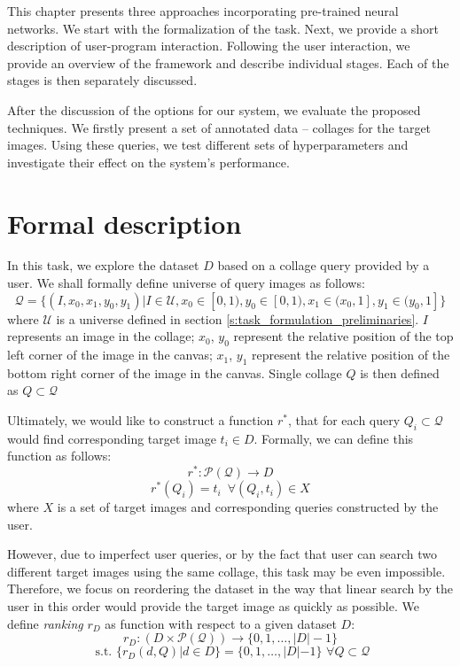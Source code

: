 This chapter presents three approaches incorporating pre-trained neural networks. We start with the formalization of the task. Next, we provide a short description of user-program interaction. Following the user interaction, we provide an overview of the framework and describe individual stages. Each of the stages is then separately discussed. 

After the discussion of the options for our system, we evaluate the proposed techniques. We firstly present a set of annotated data -- collages for the target images. Using these queries, we test different sets of hyperparameters and investigate their effect on the system's performance. 

\section{Formal description}
\label{s:task_formulation}

In this task, we explore the dataset $D$ based on a collage query provided by a user. We shall formally define universe of query images as follows: 
$$
    \mathcal{Q} = \{(I, x_0, x_1, y_0, y_1) | I \in \mathcal{U}, x_0 \in [0,1), y_0 \in [0, 1), x_1 \in (x_0, 1], y_1 \in (y_0, 1] \}
$$
where $\mathcal{U}$ is a universe defined in section \ref{s:task_formulation_preliminaries}. $I$ represents an image in the collage; $x_0$, $y_0$ represent the relative position of the top left corner of the image in the canvas; $x_1$, $y_1$ represent the relative position of the bottom right corner of the image in the canvas. Single collage $Q$ is then defined as $Q \subset \mathcal{Q}$

Ultimately, we would like to construct a function $r^*$, that for each query $Q_i \subset \mathcal{Q}$ would find corresponding target image $t_i \in D$. Formally, we can define this function as follows:
$$
    r^*: \mathcal{P(Q)} \rightarrow D 
$$
$$
    r^*(Q_i) = t_i \,\,\, \forall (Q_i, t_i) \in X
$$
where $X$ is a set of target images and corresponding queries constructed by the user.

However, due to imperfect user queries, or by the fact that user can search two different target images using the same collage, this task may be even impossible. Therefore, we focus on reordering the dataset in the way that linear search by the user in this order would provide the target image as quickly as possible. We define \emph{ranking} $r_{D}$ as function with respect to a given dataset $D$:
$$
    r_D: (D \times \mathcal{P(Q)}) \rightarrow \{0, 1, \ldots, |D|-1  \}
$$
$$
    \text{ s.t. } \{r_D(d, Q) | d \in D \} = \{0, 1, \ldots, |D|-1  \} \,\, \forall Q \subset \mathcal{Q}
$$

